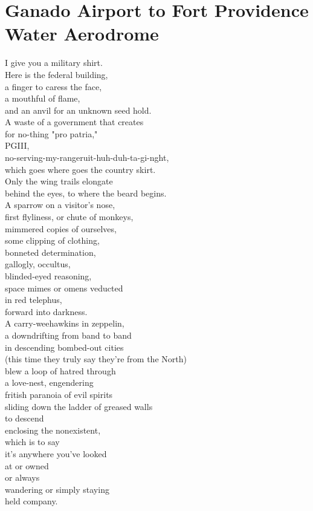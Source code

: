 \documentclass[smalldemyvopaper,11pt,twoside,onecolumn,openright,extrafontsizes]{memoir}
\begin{document}
\chapter{Ganado Airport to Fort Providence Water Aerodrome}
I give you a military shirt.
\\Here is the federal building,
\\a finger to caress the face,
\\a mouthful of flame,
\\and an anvil for an unknown seed hold.
\\A waste of a government that creates
\\for no-thing "pro patria,"
\\PGIII,
\\no-serving-my-rangeruit-huh-duh-ta-gi-nght,
\\which goes where goes the country skirt.
\\Only the wing trails elongate
\\behind the eyes, to where the beard begins.
\\A sparrow on a visitor's nose,
\\first flyliness, or chute of monkeys,
\\mimmered copies of ourselves,
\\some clipping of clothing,
\\bonneted determination,
\\gallogly, occultus,
\\blinded-eyed reasoning,
\\space mimes or omens veducted
\\in red telephus,
\\forward into darkness.
\\A carry-weehawkins in zeppelin,
\\a downdrifting from band to band
\\in descending bombed-out cities
\\(this time they truly say they're from the North)
\\blew a loop of hatred through
\\a love-nest, engendering
\\fritish paranoia of evil spirits
\\sliding down the ladder of greased walls
\\to descend
\\enclosing the nonexistent,
\\which is to say
\\it's anywhere you've looked
\\at or owned
\\or always
\\wandering or simply staying
\\held company.
\end{document}
